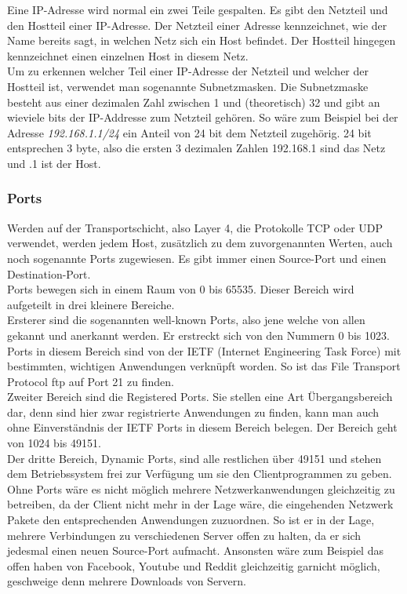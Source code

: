 \documentclass[11pt,a4paper]{report}
\begin{document}
Eine IP-Adresse wird normal ein zwei Teile gespalten. Es gibt den Netzteil und den Hostteil einer IP-Adresse. Der Netzteil einer Adresse kennzeichnet, wie der Name bereits sagt, in welchen Netz sich ein Host befindet. Der Hostteil hingegen kennzeichnet einen einzelnen Host in diesem Netz.\\
Um zu erkennen welcher Teil einer IP-Adresse der Netzteil und welcher der Hostteil ist, verwendet man sogenannte Subnetzmasken. Die Subnetzmaske besteht aus einer dezimalen Zahl zwischen 1 und (theoretisch) 32 und gibt an wieviele bits der IP-Addresse zum Netzteil gehören. So wäre zum Beispiel bei der Adresse \textit{192.168.1.1/24} ein Anteil von 24 bit dem Netzteil zugehörig. 24 bit entsprechen 3 byte, also die ersten 3 dezimalen Zahlen 192.168.1 sind das Netz und .1 ist der Host.
\subsubsection{Ports}
Werden auf der Transportschicht, also Layer 4, die Protokolle TCP oder UDP verwendet, werden jedem Host, zusätzlich zu dem zuvorgenannten Werten, auch noch sogenannte Ports zugewiesen. Es gibt immer einen Source-Port und einen Destination-Port.\\
Ports bewegen sich in einem Raum von 0 bis 65535. Dieser Bereich wird aufgeteilt in drei kleinere Bereiche.\\
Ersterer sind die sogenannten well-known Ports, also jene welche von allen gekannt und anerkannt werden. Er erstreckt sich von den Nummern 0 bis 1023. Ports in diesem Bereich sind von der IETF (Internet Engineering Task Force) mit bestimmten, wichtigen Anwendungen verknüpft worden. So ist das File Transport Protocol ftp auf Port 21 zu finden.\\
Zweiter Bereich sind die Registered Ports. Sie stellen eine Art Übergangsbereich dar, denn sind hier zwar registrierte Anwendungen zu finden, kann man auch ohne Einverständnis der IETF Ports in diesem Bereich belegen. Der Bereich geht von 1024 bis 49151.\\
Der dritte Bereich, Dynamic Ports, sind alle restlichen über 49151 und stehen dem Betriebssystem frei zur Verfügung um sie den Clientprogrammen zu geben.\\

Ohne Ports wäre es nicht möglich mehrere Netzwerkanwendungen gleichzeitig zu betreiben, da der Client nicht mehr in der Lage wäre, die eingehenden Netzwerk Pakete den entsprechenden Anwendungen zuzuordnen. So ist er in der Lage, mehrere Verbindungen zu verschiedenen Server offen zu halten, da er sich jedesmal einen neuen Source-Port aufmacht. Ansonsten wäre zum Beispiel das offen haben von Facebook, Youtube und Reddit gleichzeitig garnicht möglich, geschweige denn mehrere Downloads von Servern.\\
\end{document}
